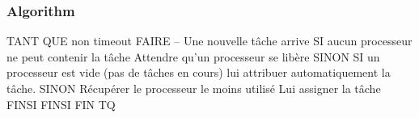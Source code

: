 \subsubsection*{Algorithm}

\begin{DoxyVerb}TANT QUE non timeout FAIRE
    -- Une nouvelle tâche arrive
    SI aucun processeur ne peut contenir la tâche
        Attendre qu'un processeur se libère
    SINON
        SI un processeur est vide (pas de tâches en cours)
            lui attribuer automatiquement la tâche.
        SINON
            Récupérer le processeur le moins utilisé
            Lui assigner la tâche
        FINSI
    FINSI
FIN TQ\end{DoxyVerb}
 